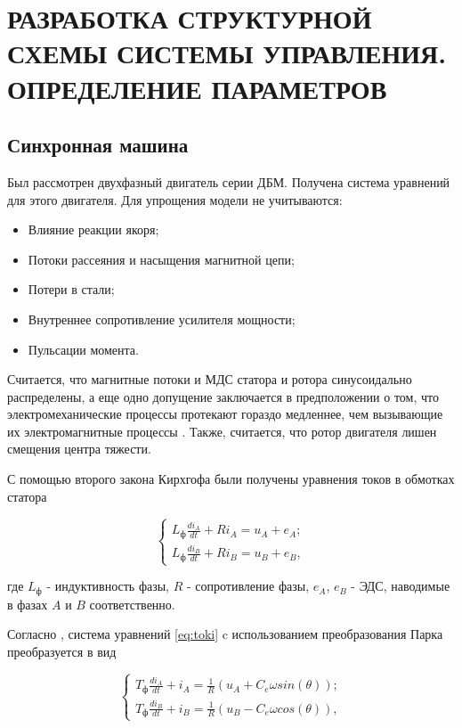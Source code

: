 \section{РАЗРАБОТКА СТРУКТУРНОЙ СХЕМЫ СИСТЕМЫ УПРАВЛЕНИЯ. ОПРЕДЕЛЕНИЕ ПАРАМЕТРОВ}

\subsection{Синхронная машина}

Был рассмотрен двухфазный двигатель серии ДБМ. Получена система 
уравнений для этого двигателя. Для упрощения модели не учитываются:
\begin{itemize}
  \item Влияние реакции якоря;
  \item Потоки рассеяния и насыщения магнитной цепи;
  \item Потери в стали;
  \item Внутреннее сопротивление усилителя мощности;
  \item Пульсации момента.
\end{itemize}

Считается, что магнитные потоки и МДС статора и ротора синусоидально
распределены, а еще одно допущение заключается в предположении о том, что
электромеханические процессы протекают гораздо медленнее, чем вызывающие их 
электромагнитные процессы \cite{БеленькийМикеровМоментныйПривод}. Также, 
считается, что ротор двигателя лишен смещения центра тяжести.

С помощью второго закона Кирхгофа были получены уравнения токов в обмотках
статора

\begin{equation}
  \begin{cases}
    L_{\text{ф}}\frac{di_A}{dt}+Ri_A=u_A+e_A;
    \\
    L_{\text{ф}}\frac{di_B}{dt}+Ri_B=u_B+e_B,
  \end{cases}
  \label{eq:toki}
\end{equation}

где $L_{\text{ф}}$ - индуктивность фазы, $R$ - сопротивление фазы, 
$e_A$, $e_B$ - ЭДС, наводимые в фазах $A$ и $B$ соответственно.

Согласно \cite{БеленькийМикеровМоментныйПривод}, система уравнений 
\ref{eq:toki} c 
использованием преобразования Парка преобразуется в вид

\begin{equation}
  \begin{cases}
    T_{\text{ф}}\frac{di_A}{dt}+i_A=\frac{1}{R}(u_A+C_e\omega sin(\theta));
    \\
    T_{\text{ф}}\frac{di_B}{dt}+i_B=\frac{1}{R}(u_B-C_e\omega cos(\theta)),
  \end{cases}
  \label{eq:toki2}
\end{equation}


